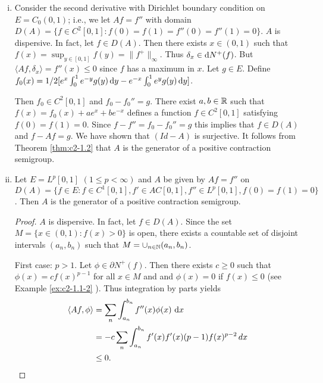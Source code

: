 \begin{examples}\label{ex:c2-1.5}
\begin{enumerate}[(i), wide, labelsep=1em, itemindent=\parindent]  %
\item \label{ex:c2-1.5-1}
Consider the second derivative with Dirichlet boundary condition on $E = C_{0}(0,1)$; i.e., we let $Af = f''$ with domain $D(A) = \{f \in C^{2}[0,1] : f(0) = f(1) = f''(0) = f''(1) = 0\}$.
$A$ is dispersive. 
In fact, let $f \in D(A)$. 
Then there exists $x \in (0,1)$ such that $f(x) = \sup_{y \in [0,1]} f(y) = \|f^{+}\|_{\infty}$. 
Thus $\delta_{x} \in \mathop{}\!\mathrm{d}{N^{+}}(f)$. 
But $\langle Af,\delta_{x} \rangle = f''(x) \leq 0$ since $f$ has a maximum in $x$.
Let $g \in E$. 
Define $f_{0}(x) = 1/2 [e^{x} \int_{0}^{1} e^{-y}g(y) \mathop{}\!\mathrm{d}{y} - e^{-x} \int_{0}^{1} e^{y}g(y) \mathop{}\!\mathrm{d}{y}]$.

Then $f_{0} \in C^{2}[0,1]$ and $f_{0} - f_{0}'' = g$. 
There exist $a, b \in \mathbb{R}$ such that $f(x) = f_{0}(x) + ae^{x} + be^{-x}$ defines a function $f \in C^{2}[0,1]$ satisfying $f(0) = f(1) = 0$. Since $f - f'' = f_{0} - f_{0}'' = g$ this implies that $f \in D(A)$ and $f - Af = g$. We have shown that $(Id - A)$ is surjective. It follows from Theorem 
\ref{thm:c2-1.2}    that $A$ is the generator of a positive contraction semigroup.
\item \label{ex:c2-1.5-2}
Let $E = L^{p}[0,1]$ $(1 \leq p < \infty)$ and $A$ be given by $Af = f''$ on $D(A) = \{f \in E : f \in C^{1}[0,1], f' \in AC[0,1], f'' \in L^{p}[0,1], f(0) = f(1) = 0\}$. 
Then $A$ is the generator of a positive contraction semigroup.
\begin{proof}
$A$ is dispersive. 
In fact, let $f \in D(A)$. 
Since the set $M = \{x \in (0,1) : f(x) > 0\}$ is open, there exists a countable set of disjoint intervals $(a_{n},b_{n})$ such that $M = \cup_{n \in \mathbb{N}} (a_{n},b_{n})$.

First case: $p > 1$.
Let $\phi \in \partial N^{+}(f)$. 
Then there exists $c \geq 0$ such that $\phi(x) = c f(x)^{p-1}$ for all $x \in M$ and and $\phi(x) = 0$ if $f(x) \leq 0$ (see Example \ref{ex:c2-1.1-2} ). 
Thus integration by parts yields
\begin{align*}
\langle Af,\phi \rangle &= \sum_{n} \int_{a_{n}}^{b_{n}} f''(x)\phi(x) \, \mathop{}\!\mathrm{d}{x} \\
&= -c \sum_{n} \int_{a_{n}}^{b_{n}} f'(x)f'(x) (p-1)f(x)^{p-2} \, dx \\
&\leq 0.
\end{align*}


\end{proof}
\end{enumerate}
\end{examples}

